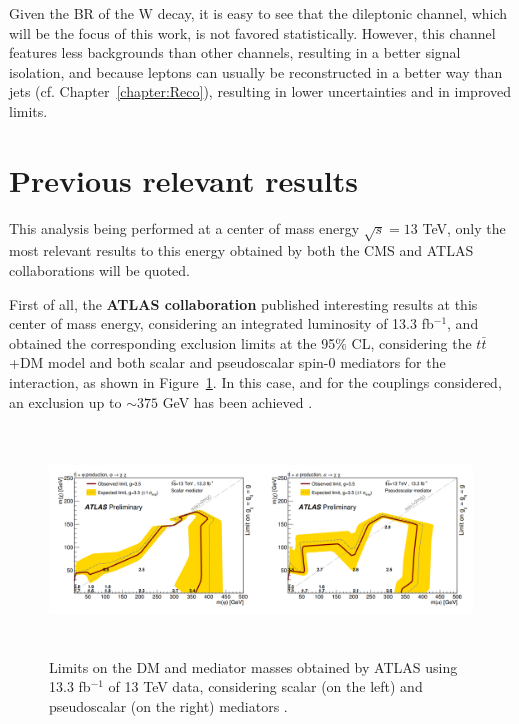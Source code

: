 \documentclass[a4paper, 10pt, openright]{report}
\begin{document}
Given the \ac{BR} of the W decay, it is easy to see that the dileptonic channel, which will be the focus of this work, is not favored statistically. However, this channel features less backgrounds than other channels, resulting in a better signal isolation, and because leptons can usually be reconstructed in a better way than jets (cf. Chapter~\ref{chapter:Reco}), resulting in lower uncertainties and in improved limits.

\section{Previous relevant results} \label{section:PreviousResults}

This analysis being performed at a center of mass energy $\sqrt{s} = 13$ TeV, only the most relevant results to this energy obtained by both the \ac{CMS} and \ac{ATLAS} collaborations will be quoted. 

First of all, the \textbf{\ac{ATLAS} collaboration} published interesting results at this center of mass energy, considering an integrated luminosity of 13.3 fb$^{-1}$, and obtained the corresponding exclusion limits at the 95\% \ac{CL}, considering the $t \bar t$+DM model and both scalar and pseudoscalar spin-0 mediators for the interaction, as shown in Figure~\ref{fig:ATLAS13}. In this case, and for the couplings considered, an exclusion up to $\sim 375$ GeV has been achieved \cite{PreviousDoubleTopNoLep13ATLAS}.

\begin{figure}[htbp]
\begin{center}
\includegraphics[width=14cm, height=6cm]{figs/Atlasttbar13fb.png}
\caption{Limits on the \ac{DM} and mediator masses obtained by \ac{ATLAS} using 13.3 fb$^{-1}$ of 13 TeV data, considering scalar (on the left) and pseudoscalar (on the right) mediators \cite{PreviousDoubleTopNoLep13ATLAS}.}
\label{fig:ATLAS13}
\end{center}
\end{figure}
\end{document}
